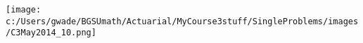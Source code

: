 
\texttt{[image: c:/Users/gwade/BGSUmath/Actuarial/MyCourse3stuff/SingleProblems/images/C3May2014\_10.png]}

\showsol{\bsoln

  \esoln}
